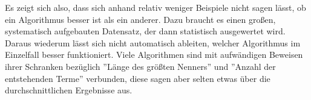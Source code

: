 Es zeigt sich also, dass sich anhand relativ weniger Beispiele nicht sagen lässt, ob ein Algorithmus besser ist als ein anderer. Dazu braucht es einen großen, systematisch aufgebauten Datensatz, der dann statistisch ausgewertet wird. Daraus wiederum lässt sich nicht automatisch ableiten, welcher Algorithmus im Einzelfall besser funktioniert. Viele Algorithmen sind mit aufwändigen Beweisen ihrer Schranken bezüglich ''Länge des größten Nenners'' und ''Anzahl der entstehenden Terme'' verbunden, diese sagen aber selten etwas über die durchschnittlichen Ergebnisse aus.